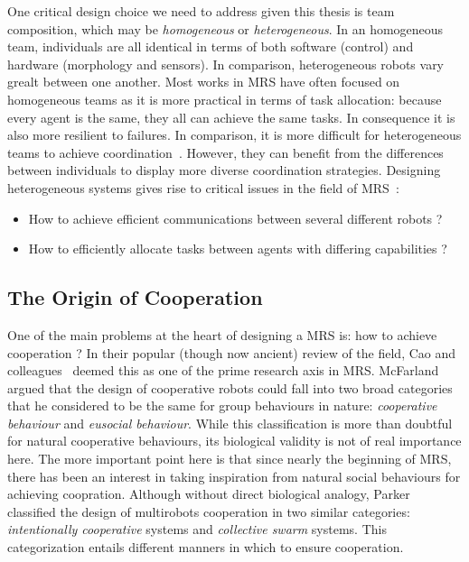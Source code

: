     One critical design choice we need to address given this thesis is team composition, which may be \emph{homogeneous} or \emph{heterogeneous}. In an homogeneous team, individuals are all identical in terms of both software (control) and hardware (morphology and sensors). In comparison, heterogeneous robots vary grealt between one another. Most works in MRS have often focused on homogeneous teams as it is more practical in terms of task allocation: because every agent is the same, they all can achieve the same tasks. In consequence it is also more resilient to failures. In comparison, it is more difficult for heterogeneous teams to achieve coordination~\parencite{Parker1994}. However, they can benefit from the differences between individuals to display more diverse coordination strategies. Designing heterogeneous systems gives rise to critical issues in the field of MRS~\parencite{Parker2008}:

    \begin{itemize}
      \item{How to achieve efficient communications between several different robots ?~\parencite{Jung2000}}
      \item{How to efficiently allocate tasks between agents with differing capabilities ?~\parencite{Parker2003}}
    \end{itemize}


  \subsection{The Origin of Cooperation} 

    One of the main problems at the heart of designing a MRS is: how to achieve cooperation ? In their popular (though now ancient) review of the field, Cao and colleagues~\parencite{Cao1997} deemed this as one of the prime research axis in MRS. McFarland~\parencite{McFarland1996} argued that the design of cooperative robots could fall into two broad categories that he considered to be the same for group behaviours in nature: \emph{cooperative behaviour} and \emph{eusocial behaviour}. While this classification is more than doubtful for natural cooperative behaviours, its biological validity is not of real importance here. The more important point here is that since nearly the beginning of MRS, there has been an interest in taking inspiration from natural social behaviours for achieving coopration. Although without direct biological analogy, Parker~\parencite{Parker2008} classified the design of multirobots cooperation in two similar categories: \emph{intentionally cooperative} systems and \emph{collective swarm} systems. This categorization entails different manners in which to ensure cooperation.

